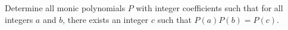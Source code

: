 Determine all monic polynomials $P$ with integer coefficients such that for all integers $a$ and $b$,
there exists an integer $c$ such that $P(a)P(b) = P(c)$.
